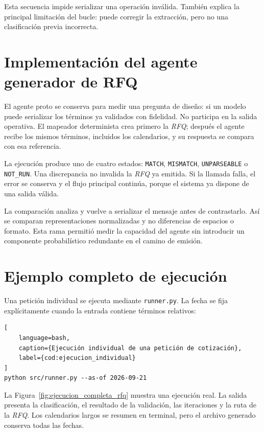 Esta secuencia impide serializar una operación inválida. También explica la principal limitación del bucle: puede corregir la extracción, pero no una clasificación previa incorrecta.

\section{Implementación del agente generador de RFQ}
\label{sec:implementacion_agente_proto}

El agente proto se conserva para medir una pregunta de diseño: si un modelo puede serializar los términos ya validados con fidelidad. No participa en la salida operativa. El mapeador determinista crea primero la \textit{RFQ}; después el agente recibe los mismos términos, incluidos los calendarios, y su respuesta se compara con esa referencia.

La ejecución produce uno de cuatro estados: \texttt{MATCH}, \texttt{MISMATCH}, \texttt{UNPARSEABLE} o \texttt{NOT\_RUN}. Una discrepancia no invalida la \textit{RFQ} ya emitida. Si la llamada falla, el error se conserva y el flujo principal continúa, porque el sistema ya dispone de una salida válida.

La comparación analiza y vuelve a serializar el mensaje antes de contrastarlo. Así se comparan representaciones normalizadas y no diferencias de espacios o formato. Esta rama permitió medir la capacidad del agente sin introducir un componente probabilístico redundante en el camino de emisión.

\section{Ejemplo completo de ejecución}
\label{sec:ejemplo_ejecucion}

Una petición individual se ejecuta mediante \texttt{runner.py}. La fecha se fija explícitamente cuando la entrada contiene términos relativos:

\begin{lstlisting}[
    language=bash,
    caption={Ejecución individual de una petición de cotización},
    label={cod:ejecucion_individual}
]
python src/runner.py --as-of 2026-09-21
\end{lstlisting}

La Figura~\ref{fig:ejecucion_completa_rfq} muestra una ejecución real. La salida presenta la clasificación, el resultado de la validación, las iteraciones y la ruta de la \textit{RFQ}. Los calendarios largos se resumen en terminal, pero el archivo generado conserva todas las fechas.

